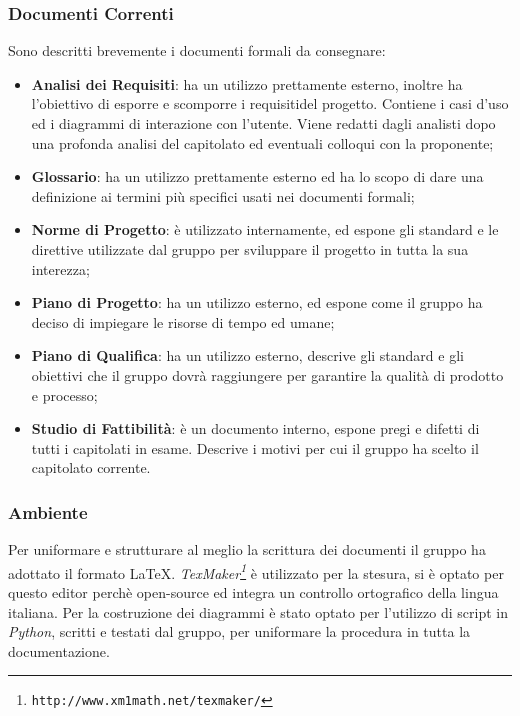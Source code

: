\subsubsection{Documenti Correnti}\label{ProcessiSupporto_Documentazione_DocumentiCorrenti}
Sono descritti brevemente i documenti formali da consegnare:
\begin{itemize}
	\item \textbf{Analisi dei Requisiti}: ha un utilizzo prettamente esterno, inoltre ha l'obiettivo di esporre e scomporre i requisiti\glossario del progetto. Contiene i casi d'uso ed i diagrammi di interazione con l'utente. Viene redatti dagli analisti dopo una profonda analisi del capitolato ed eventuali colloqui con la proponente; 
	\item \textbf{Glossario}: ha un utilizzo prettamente esterno ed ha lo scopo di dare una definizione ai termini più specifici usati nei documenti formali;
	\item \textbf{Norme di Progetto}: è utilizzato internamente, ed espone gli standard e le direttive utilizzate dal gruppo per sviluppare il progetto in tutta la sua interezza;
	\item \textbf{Piano di Progetto}: ha un utilizzo esterno, ed espone come il gruppo ha deciso di impiegare le risorse di tempo ed umane;
	\item \textbf{Piano di Qualifica}: ha un utilizzo esterno, descrive gli standard e gli obiettivi che il gruppo dovrà raggiungere per garantire la qualità di prodotto e processo;
	\item \textbf{Studio di Fattibilità}: è un documento interno, espone pregi e difetti di tutti i capitolati in esame. Descrive i motivi per cui il gruppo ha scelto il capitolato corrente.
\end{itemize}

\subsubsection{Ambiente}\label{ProcessiSupporto_Documentazione_Ambiente} 
Per uniformare e strutturare al meglio la scrittura dei documenti il gruppo ha adottato il formato \LaTeX. 
\textit{TexMaker\footnote{\texttt{http://www.xm1math.net/texmaker/}}} è utilizzato per la stesura, si è optato per questo editor perchè open-source ed integra un controllo ortografico della lingua italiana. 
Per la costruzione dei diagrammi è stato optato per l'utilizzo di script in \textit{Python}, scritti e testati dal gruppo, per uniformare la procedura in tutta la documentazione.




